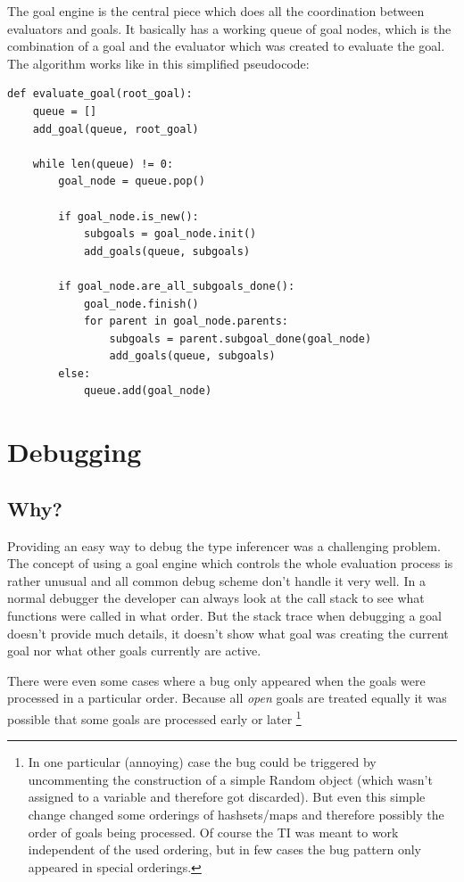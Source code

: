 \documentclass[12pt,halfparskip]{scrreprt}
\begin{document}
The goal engine is the central piece which does all the coordination between evaluators and goals. It basically has a working queue of goal nodes, which is the combination of a goal and the evaluator which was created to evaluate the goal. The algorithm works like in this simplified pseudocode:

\begin{lstlisting}
def evaluate_goal(root_goal):
    queue = []
    add_goal(queue, root_goal)

    while len(queue) != 0:
        goal_node = queue.pop()

        if goal_node.is_new():
            subgoals = goal_node.init()
            add_goals(queue, subgoals)

        if goal_node.are_all_subgoals_done():
            goal_node.finish()
            for parent in goal_node.parents:
                subgoals = parent.subgoal_done(goal_node)
                add_goals(queue, subgoals)
        else:
            queue.add(goal_node)
\end{lstlisting}


\section{Debugging}

\subsection{Why?}

Providing an easy way to debug the type inferencer was a challenging problem. The concept of using a goal engine which controls the whole evaluation process is rather unusual and all common debug scheme don't handle it very well. In a normal debugger the developer can always look at the call stack to see what functions were called in what order. But the stack trace when debugging a goal doesn't provide much details, it doesn't show what goal was creating the current goal nor what other goals currently are active.

There were even some cases where a bug only appeared when the goals were processed in a particular order. Because all \emph{open} goals are treated equally it was possible that some goals are processed early or later
\footnote{In one particular (annoying) case the bug could be triggered by uncommenting the construction of a simple Random object (which wasn't assigned to a variable and therefore got discarded). But even this simple change changed some orderings of hashsets/maps and therefore possibly the order of goals being processed. Of course the TI was meant to work independent of the used ordering, but in few cases the bug pattern only appeared in special orderings.}
\end{document}
